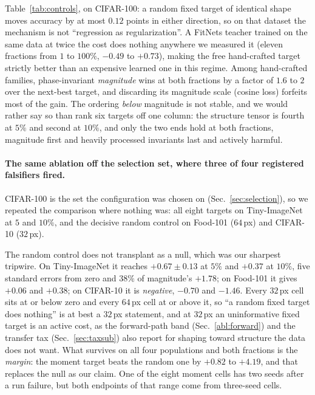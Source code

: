  Table~\ref{tab:controls}, on CIFAR-100: a random fixed target of
identical shape moves accuracy by at most $0.12$ points in either direction, so
on that dataset the mechanism is not ``regression as regularization''. A
FitNets teacher trained on
the same data at twice the cost does nothing anywhere we measured it (eleven
fractions from $1$ to $100\%$, $-0.49$ to $+0.73$), making the free
hand-crafted target strictly better than an expensive learned one in this
regime. Among hand-crafted families, phase-invariant \emph{magnitude} wins at
both fractions by a factor of $1.6$ to $2$ over the next-best target, and
discarding its magnitude scale (cosine loss) forfeits most of the gain. The
ordering \emph{below} magnitude is not stable, and we would rather say so than
rank six targets off one column: the structure tensor is fourth at $5\%$ and
second at $10\%$, and only the two ends hold at both fractions, magnitude first
and heavily processed invariants last and actively harmful.

\paragraph{The same ablation off the selection set, where three of four
registered falsifiers fired.} CIFAR-100 is the set the configuration was chosen
on (Sec.~\ref{sec:selection}), so we repeated the comparison where nothing
was: all eight targets on Tiny-ImageNet at $5$ and $10\%$, and the decisive
random control on Food-101 ($64$\,px) and CIFAR-10 ($32$\,px).

 The random control does not transplant as a null, which was our sharpest
tripwire. On Tiny-ImageNet it reaches $+0.67 \pm 0.13$ at $5\%$ and $+0.37$ at
$10\%$, five standard errors from zero and $38\%$ of magnitude's $+1.78$; on
Food-101 it gives $+0.06$ and $+0.38$; on CIFAR-10 it is \emph{negative},
$-0.70$ and $-1.46$. Every $32$\,px cell sits at or below zero and every
$64$\,px cell at or above it, so ``a random fixed target does nothing'' is at
best a $32$\,px statement, and at $32$\,px an uninformative fixed target is an
active cost, as the forward-path band (Sec.~\ref{abl:forward}) and the
transfer tax (Sec.~\ref{sec:taxsub}) also report for shaping toward
structure the data does not want. What survives on all four populations and
both fractions is the \emph{margin}: the moment target beats the random one by
$+0.82$ to $+4.19$, and that replaces the null as our claim. One of the eight
moment cells has two seeds after a run failure, but both endpoints of that
range come from three-seed cells.

